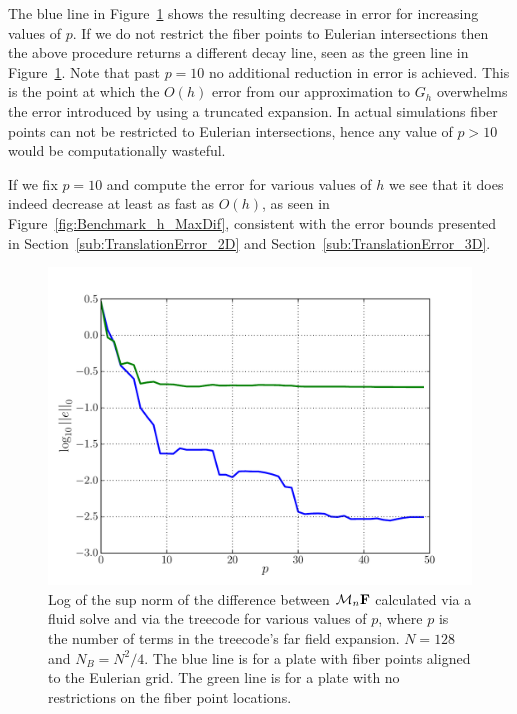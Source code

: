 The blue line in Figure~\ref{fig:Benchmark_p_MaxDif} shows the resulting decrease in error for increasing values of $p$. If we do not restrict the fiber points to Eulerian intersections then the above procedure returns a different decay line, seen as the green line in Figure~\ref{fig:Benchmark_p_MaxDif}. Note that past $p=10$ no additional reduction in error is achieved. This is the point at which the $O(h)$ error from our approximation to $G_h$ overwhelms the error introduced by using a truncated expansion. In actual simulations fiber points can not be restricted to Eulerian intersections, hence any value of $p > 10$ would be computationally wasteful.


If we fix $p=10$ and compute the error for various values of $h$ we see that it does indeed decrease at least as fast as $O(h)$, as seen in Figure~\ref{fig:Benchmark_h_MaxDif}, consistent with the error bounds presented in Section~\ref{sub:TranslationError_2D} and Section~\ref{sub:TranslationError_3D}.


\begin{figure}[!b]
	\begin{center}
		\includegraphics[bb=0in 0in 7.7in 6.3in,width=\StandardFigureWidth,clip]{Images_Methodology/Benchmark_p_MaxDif.pdf}
	\end{center}
	\caption{Log of the sup norm of the difference between $\mathcal{M}_n\mathbf{F}$ calculated via a fluid solve and via the treecode for various values of $p$, where $p$ is the number of terms in the treecode's far field expansion. $N=128$ and $N_B=N^2/4$. The blue line is for a plate with fiber points aligned to the Eulerian grid. The green line is for a plate with no restrictions on the fiber point locations.}
	\label{fig:Benchmark_p_MaxDif}
\end{figure}

